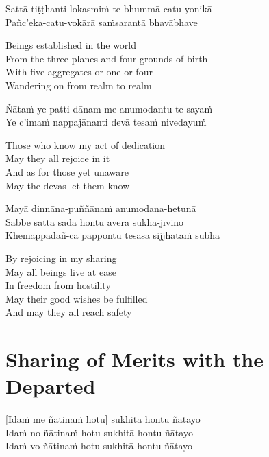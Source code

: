 Sattā tiṭṭhanti lokasmiṁ te bhummā catu-yonikā\\
Pañc'eka-catu-vokārā saṁsarantā bhavābhave

\begin{english}
  Beings established in the world\\
  From the three planes and four grounds of birth\\
  With five aggregates or one or four\\
  Wandering on from realm to realm
\end{english}

Ñātaṁ ye patti-dānam-me anumodantu te sayaṁ\\
Ye c'imaṁ nappajānanti devā tesaṁ nivedayuṁ

\begin{english}
  Those who know my act of dedication\\
  May they all rejoice in it\\
  And as for those yet unaware\\
  May the devas let them know
\end{english}

Mayā dinnāna-puññānaṁ anumodana-hetunā\\
Sabbe sattā sadā hontu averā sukha-jīvino\\
Khemappadañ-ca pappontu tesāsā sijjhataṁ subhā

\begin{english}
  By rejoicing in my sharing\\
  May all beings live at ease\\
  In freedom from hostility\\
  May their good wishes be fulfilled\\
  And may they all reach safety
\end{english}

\suttaRef{[Thai]}


\section{Sharing of Merits with the Departed}
\label{sharing-merits-departed}

[Idaṁ me ñātinaṁ hotu] sukhitā hontu ñātayo\\
Idaṁ no ñātinaṁ hotu sukhitā hontu ñātayo\\
Idaṁ vo ñātinaṁ hotu sukhitā hontu ñātayo

